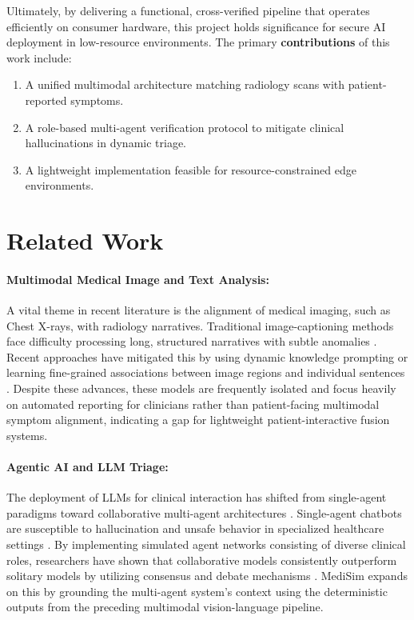 \documentclass[11pt,a4paper]{article}
\begin{document}
Ultimately, by delivering a functional, cross-verified pipeline that operates efficiently on consumer hardware, this project holds significance for secure AI deployment in low-resource environments. The primary \textbf{contributions} of this work include:
\begin{enumerate}[noitemsep]
    \item A unified multimodal architecture matching radiology scans with patient-reported symptoms.
    \item A role-based multi-agent verification protocol to mitigate clinical hallucinations in dynamic triage.
    \item A lightweight implementation feasible for resource-constrained edge environments.
\end{enumerate}

\section{Related Work}

\paragraph{Multimodal Medical Image and Text Analysis:} 
A vital theme in recent literature is the alignment of medical imaging, such as Chest X-rays, with radiology narratives. Traditional image-captioning methods face difficulty processing long, structured narratives with subtle anomalies \citep{liu2021contrastive}. Recent approaches have mitigated this by using dynamic knowledge prompting \citep{bu2024dynamic} or learning fine-grained associations between image regions and individual sentences \citep{wang2023fine}. Despite these advances, these models are frequently isolated and focus heavily on automated reporting for clinicians rather than patient-facing multimodal symptom alignment, indicating a gap for lightweight patient-interactive fusion systems.

\paragraph{Agentic AI and LLM Triage:} 
The deployment of LLMs for clinical interaction has shifted from single-agent paradigms toward collaborative multi-agent architectures \citep{lu2024triageagent}. Single-agent chatbots are susceptible to hallucination and unsafe behavior in specialized healthcare settings \citep{sahu2025occutriage, wu2025kamac}. By implementing simulated agent networks consisting of diverse clinical roles, researchers have shown that collaborative models consistently outperform solitary models by utilizing consensus and debate mechanisms \citep{fan2025aihospital}. MediSim expands on this by grounding the multi-agent system’s context using the deterministic outputs from the preceding multimodal vision-language pipeline. 
\end{document}
